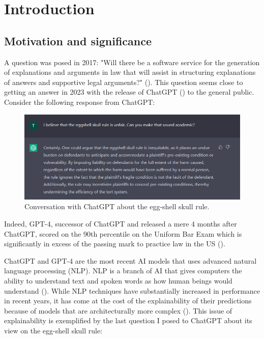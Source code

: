 \chapter{Introduction} %

\label{chapter1} %

\section{Motivation and significance}
A question was posed in 2017: "Will there be a software service for the generation of explanations and arguments in law that will assist in structuring explanations of answers and supportive legal arguments?" (\cite{ashley_2017}). This question seems close to getting an answer in 2023 with the release of ChatGPT (\cite{openai}) to the general public. Consider the following response from ChatGPT:  

\begin{figure}[!ht]
	\centering
	\includegraphics[width=1\linewidth]{figures/chatgpt3.png}
	\caption{Conversation with ChatGPT about the egg-shell skull rule.}   
  \label{fig:chatgpt}
\end{figure}

Indeed, GPT-4, successor of ChatGPT and released a mere 4 months after ChatGPT, scored on the 90th percentile on the Uniform Bar Exam which is significantly in excess of the passing mark to practice law in the US (\cite{katz2023gpt}).

ChatGPT and GPT-4 are the most recent AI models that uses advanced natural language processing (NLP). NLP is a branch of AI that gives computers the ability to understand text and spoken words as how human beings would understand (\cite{ibm_nlp}). While NLP techniques have substantially increased in performance in recent years, it has come at the cost of the explainability of their predictions because of models that are architecturally more complex (\cite{zini2022}). This issue of explainability is exemplified by the last question I posed to ChatGPT about its view on the egg-shell skull rule:

